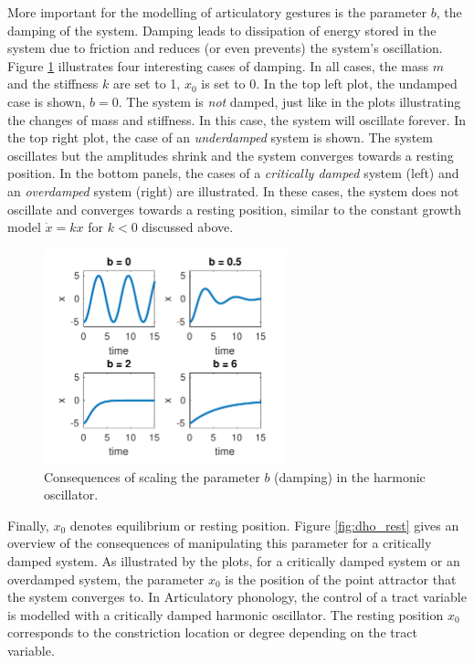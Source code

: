 More important for the modelling of articulatory gestures is the parameter $b$, the damping of the system. Damping leads to dissipation of energy stored in the system due to friction and reduces (or even prevents) the system’s oscillation. Figure \ref{fig:dho_damp} illustrates four interesting cases of damping. In all cases, the mass $m$ and the stiffness $k$ are set to 1, $x_0$ is set to 0. In the top left plot, the undamped case is shown, $b = 0$. The system is \emph{not} damped, just like in the plots illustrating the changes of mass and stiffness. In this case, the system will oscillate forever. In the top right plot, the case of an \emph{underdamped} system is shown. The system oscillates but the amplitudes shrink and the system converges towards a resting position. In the bottom panels, the cases of a \emph{critically damped} system (left) and an \emph{overdamped} system (right) are illustrated. In these cases, the system does not oscillate and converges towards a resting position, similar to the constant growth model $\dot{x} = kx$ for $k<0$ discussed above.

\begin{figure}
\includegraphics[width=7cm]{figures/ch3/dho_damping.pdf}
\caption{Consequences of scaling the parameter $b$ (damping) in the harmonic oscillator.}
\label{fig:dho_damp}
\end{figure}

\hspace*{-1mm}Finally, $x_0$ denotes equilibrium or resting position. Figure \ref{fig:dho_rest} gives an over\-view of the consequences of manipulating this parameter for a critically damped system. As illustrated by the plots, for a critically damped system or an overdamped system, the parameter $x_0$ is the position of the point attractor that the system converges to. In Articulatory phonology, the control of a tract variable is modelled with a critically damped harmonic oscillator. The resting position $x_0$ corresponds to the constriction location or degree depending on the tract variable. 

